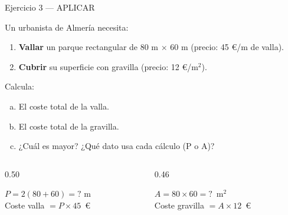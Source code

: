 \documentclass[aspectratio=169, 10pt, spanish]{beamer}
\begin{document}
\begin{frame}{Ejercicio 3 — APLICAR }
  \begin{aplicarbox}
    \AlmFontSmall Un urbanista de Almería necesita:
    \begin{enumerate}
      \item \textbf{Vallar} un parque rectangular de 80 m $\times$ 60 m
            (precio: 45 €/m de valla).
      \item \textbf{Cubrir} su superficie con gravilla
            (precio: 12 €/m$^2$).
    \end{enumerate}
    Calcula:
    \begin{enumerate}[a)]
      \item El coste total de la valla.
      \item El coste total de la gravilla.
      \item ¿Cuál es mayor? ¿Qué dato usa cada cálculo (P o A)?
    \end{enumerate}
  \end{aplicarbox}
  \vspace{0.15cm}
  \begin{columns}[c]
    \begin{column}{0.50\textwidth}
      \begin{pasobox}[1]
        \AlmFontScript $P = 2(80 + 60) = ?$ m
        \\
        Coste valla $= P \times 45$~€
      \end{pasobox}
    \end{column}
    \begin{column}{0.46\textwidth}
      \begin{pasobox}[2]
        \AlmFontScript $A = 80 \times 60 = ?$~m$^2$
        \\
        Coste gravilla $= A \times 12$~€
      \end{pasobox}
    \end{column}
  \end{columns}
\end{frame}
\end{document}
